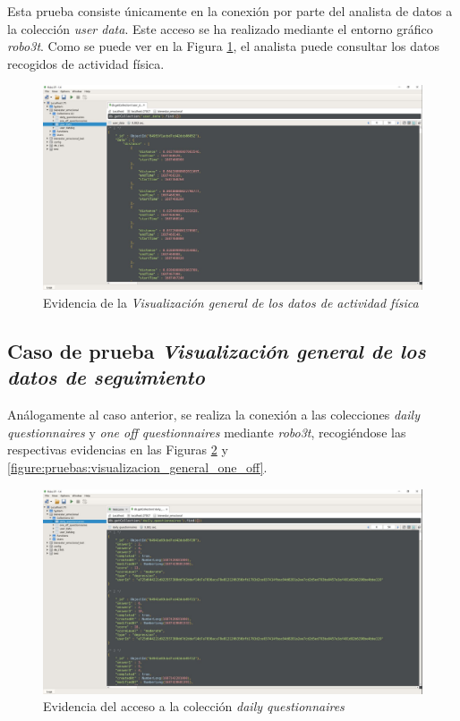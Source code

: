             Esta prueba consiste únicamente en la conexión por parte del analista de datos a la colección \textit{user data}. Este acceso se ha realizado mediante el entorno gráfico \textit{robo3t}. Como se puede ver en la Figura \ref{figure:pruebas:visualizacion_general_actividad}, el analista puede consultar los datos recogidos de actividad física.

            \begin{figure}[h]
                \centering
                \includegraphics[width=1\textwidth]{figures/pruebas/robo3t_actividad_fisica.JPG}
                \caption{Evidencia de la \textit{Visualización general de los datos de actividad física}}
                \label{figure:pruebas:visualizacion_general_actividad}
            \end{figure}
        
        \subsection*{Caso de prueba \textit{Visualización general de los datos de seguimiento}}

            Análogamente al caso anterior, se realiza la conexión a las colecciones \textit{daily questionnaires} y \textit{one off questionnaires} mediante \textit{robo3t}, recogiéndose las respectivas evidencias en las Figuras \ref{figure:pruebas:visualizacion_general_daily} y \ref{figure:pruebas:visualizacion_general_one_off}.

            \begin{figure}[h]
                \centering
                \includegraphics[width=1\textwidth]{figures/pruebas/robo3t_daily.JPG}
                \caption{Evidencia del acceso a la colección \textit{daily questionnaires}}
                \label{figure:pruebas:visualizacion_general_daily}
            \end{figure}

